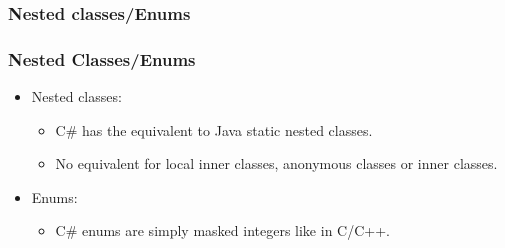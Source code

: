\documentclass{beamer}
\begin{document}
\subsubsection{Nested classes/Enums}
\begin{frame}
\frametitle{Nested Classes/Enums}
\begin{itemize}
\item Nested classes:
\begin{itemize}
\item C\# has the equivalent to Java static nested classes.
\item No equivalent for local inner classes, anonymous classes or inner classes.
\end{itemize}
\item Enums:
\begin{itemize}
\item C\# enums are simply masked integers like in C/C++.
\end{itemize}
\end{itemize}
\end{frame}
\end{document}
